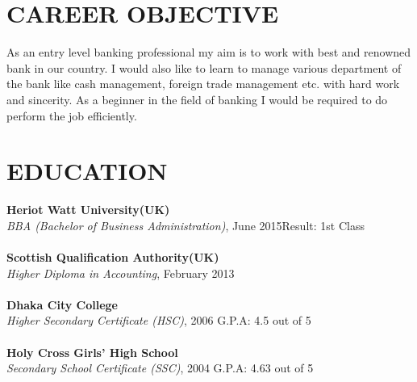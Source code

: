 \documentclass[margin]{res}
\begin{document}
\begin{resume}
%
\section{CAREER OBJECTIVE}
\par As an entry level banking professional my aim is to work with best and renowned bank in our country. I would also like to learn to manage various department of the bank like cash management, foreign trade management etc. with hard work and sincerity. As a beginner in the field of banking I would be required to do perform the job efficiently.




\section{EDUCATION}
\textbf{Heriot Watt University(UK)}\\
{\sl BBA (Bachelor of Business Administration)}, June 2015\hfill Result: 
1st Class
\\ \\
\textbf{Scottish Qualification Authority(UK)}\\
{\sl Higher Diploma in Accounting}, February 2013 
\\ \\
\textbf{Dhaka City College}\\
{\sl Higher Secondary Certificate (HSC)}, 2006 \hfill G.P.A: 4.5 out of 5
\\ \\
\textbf{Holy Cross Girls' High School}\\
{\sl Secondary School Certificate (SSC)}, 2004 \hfill G.P.A: 4.63 out of 5




\end{resume}
\end{document}
